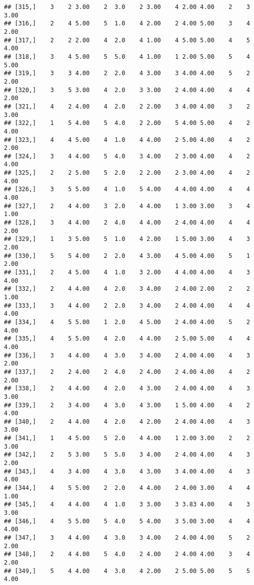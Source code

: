 \documentclass[]{article}
\begin{document}
\begin{verbatim}
## [315,]    3    2 3.00    2  3.0    2 3.00    4 2.00 4.00    2    3 3.00
## [316,]    2    4 5.00    5  1.0    4 2.00    2 4.00 5.00    3    4 2.00
## [317,]    2    2 2.00    4  2.0    4 1.00    4 5.00 5.00    4    5 4.00
## [318,]    3    4 5.00    5  5.0    4 1.00    1 2.00 5.00    5    4 5.00
## [319,]    3    3 4.00    2  2.0    4 3.00    3 4.00 4.00    5    2 2.00
## [320,]    3    5 3.00    4  2.0    3 3.00    2 4.00 4.00    4    4 2.00
## [321,]    4    2 4.00    4  2.0    2 2.00    3 4.00 4.00    3    2 3.00
## [322,]    1    5 4.00    5  4.0    2 2.00    5 4.00 5.00    4    2 4.00
## [323,]    4    4 5.00    4  1.0    4 4.00    2 5.00 4.00    4    2 2.00
## [324,]    3    4 4.00    5  4.0    3 4.00    2 3.00 4.00    4    2 4.00
## [325,]    2    2 5.00    5  2.0    2 2.00    2 3.00 4.00    4    2 4.00
## [326,]    3    5 5.00    4  1.0    5 4.00    4 4.00 4.00    4    4 4.00
## [327,]    2    4 4.00    3  2.0    4 4.00    1 3.00 3.00    3    4 1.00
## [328,]    3    4 4.00    2  4.0    4 4.00    2 4.00 4.00    4    4 2.00
## [329,]    1    3 5.00    5  1.0    4 2.00    1 5.00 3.00    4    3 2.00
## [330,]    5    5 4.00    2  2.0    4 3.00    4 5.00 4.00    5    1 2.00
## [331,]    2    4 5.00    4  1.0    3 2.00    4 4.00 4.00    4    3 4.00
## [332,]    2    4 4.00    4  2.0    3 4.00    2 4.00 2.00    2    2 1.00
## [333,]    3    4 4.00    2  2.0    3 4.00    2 4.00 4.00    4    4 4.00
## [334,]    4    5 5.00    1  2.0    4 5.00    2 4.00 4.00    5    2 4.00
## [335,]    4    5 5.00    4  2.0    4 4.00    2 5.00 5.00    4    4 4.00
## [336,]    3    4 4.00    4  3.0    3 4.00    2 4.00 4.00    4    3 2.00
## [337,]    2    2 4.00    2  4.0    2 4.00    2 4.00 4.00    4    2 2.00
## [338,]    2    4 4.00    4  2.0    4 3.00    2 4.00 4.00    4    3 3.00
## [339,]    2    3 4.00    4  3.0    4 3.00    1 5.00 4.00    4    2 4.00
## [340,]    2    4 4.00    4  2.0    4 2.00    2 4.00 4.00    4    3 3.00
## [341,]    1    4 5.00    5  2.0    4 4.00    1 2.00 3.00    2    2 3.00
## [342,]    2    5 3.00    5  5.0    3 4.00    2 4.00 4.00    4    3 2.00
## [343,]    4    3 4.00    4  3.0    4 3.00    3 4.00 4.00    4    3 4.00
## [344,]    4    5 5.00    2  2.0    4 4.00    2 4.00 3.00    4    4 1.00
## [345,]    4    4 4.00    4  1.0    3 3.00    3 3.83 4.00    4    3 3.00
## [346,]    4    5 5.00    5  4.0    5 4.00    3 5.00 3.00    4    4 4.00
## [347,]    3    4 4.00    4  3.0    3 4.00    2 4.00 4.00    5    2 2.00
## [348,]    2    4 4.00    5  4.0    2 4.00    2 4.00 4.00    3    4 2.00
## [349,]    5    4 4.00    4  3.0    4 2.00    2 5.00 5.00    5    5 4.00

\end{verbatim}
\end{document}
